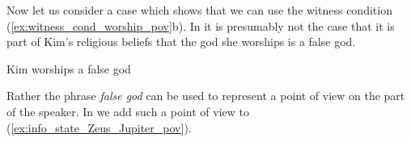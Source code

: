 Now let us consider a case which shows that we can use the witness
condition (\ref{ex:witness_cond_worship_pov}b).  In \nexteg{} it is
presumably not the case that it is part of Kim's religious beliefs
that the god she worships is a false god.  
\begin{ex} 
Kim worships a false god
\label{ex:kim-worships-a-false-god}
\end{ex} 
Rather the phrase
\textit{false god} can be used to represent a point of view on the
part of the speaker.  In \nexteg{} we add such a point of view to
(\ref{ex:info_state_Zeus_Jupiter_pov}).
\begin{ex} 


\end{ex}
